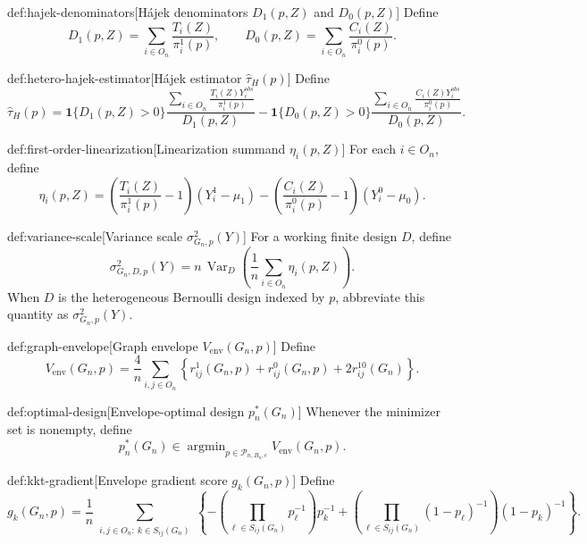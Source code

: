 \begin{definitionv}{def:hajek-denominators}[Hájek denominators $D_1(p,Z)$ and $D_0(p,Z)$]
Define
\[
D_1(p,Z)=\sum_{i\in O_n}\frac{T_i(Z)}{\pi_i^1(p)},
\qquad
D_0(p,Z)=\sum_{i\in O_n}\frac{C_i(Z)}{\pi_i^0(p)}.
\]
\end{definitionv}

\begin{definitionv}{def:hetero-hajek-estimator}[Hájek estimator $\widehat\tau_H(p)$]
Define
\[
\widehat\tau_H(p)
=
\mathbf 1\{D_1(p,Z)>0\}
\frac{\displaystyle\sum_{i\in O_n}\frac{T_i(Z)Y_i^{obs}}{\pi_i^1(p)}}{D_1(p,Z)}
-
\mathbf 1\{D_0(p,Z)>0\}
\frac{\displaystyle\sum_{i\in O_n}\frac{C_i(Z)Y_i^{obs}}{\pi_i^0(p)}}{D_0(p,Z)}.
\]
\end{definitionv}

\begin{definitionv}{def:first-order-linearization}[Linearization summand $\eta_i(p,Z)$]
For each \(i\in O_n\), define
\[
\eta_i(p,Z)
=
\left(\frac{T_i(Z)}{\pi_i^1(p)}-1\right)(Y_i^1-\mu_1)
-
\left(\frac{C_i(Z)}{\pi_i^0(p)}-1\right)(Y_i^0-\mu_0).
\]
\end{definitionv}

\begin{definitionv}{def:variance-scale}[Variance scale $\sigma^2_{G_n,p}(Y)$]
For a working finite design $D$, define
\[
\sigma^2_{G_n,D,p}(Y)
=
n\,\operatorname{Var}_D\!\left(
\frac{1}{n}\sum_{i\in O_n}\eta_i(p,Z)
\right).
\]
When $D$ is the heterogeneous Bernoulli design indexed by $p$, abbreviate this quantity as $\sigma^2_{G_n,p}(Y)$.
\end{definitionv}

\begin{definitionv}{def:graph-envelope}[Graph envelope $V_{\mathrm{env}}(G_n,p)$]
Define
\[
V_{\mathrm{env}}(G_n,p)
=
\frac{4}{n}\sum_{i,j\in O_n}
\left\{
r_{ij}^1(G_n,p)
+
r_{ij}^0(G_n,p)
+
2r_{ij}^{10}(G_n)
\right\}.
\]
\end{definitionv}

\begin{definitionv}{def:optimal-design}[Envelope-optimal design $p_n^*(G_n)$]
Whenever the minimizer set is nonempty, define
\[
p_n^*(G_n)
\in
\operatorname{argmin}_{p\in\mathcal P_{n,B_n,\epsilon}}
V_{\mathrm{env}}(G_n,p).
\]
\end{definitionv}

\begin{definitionv}{def:kkt-gradient}[Envelope gradient score $g_k(G_n,p)$]
Define
\[
g_k(G_n,p)
=
\frac{1}{n}
\sum_{\substack{i,j\in O_n:\ k\in S_{ij}(G_n)}}
\left\{
-
\left(\prod_{\ell\in S_{ij}(G_n)}p_\ell^{-1}\right)p_k^{-1}
+
\left(\prod_{\ell\in S_{ij}(G_n)}(1-p_\ell)^{-1}\right)(1-p_k)^{-1}
\right\}.
\]
\end{definitionv}

